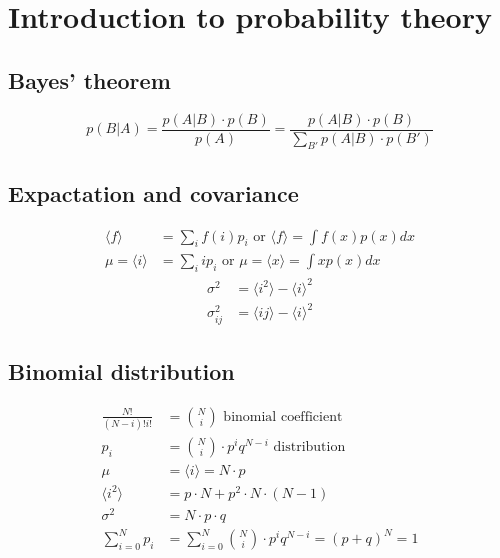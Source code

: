 \section{Introduction to probability theory}

\subsection*{Bayes' theorem}

\begin{equation*}
    p(B|A) = \frac{p(A|B) \cdot p(B)}{p(A)} = \frac{p(A|B) \cdot p(B)}{\sum_{B'}p(A|B) \cdot p(B')}
\end{equation*}

\subsection*{Expactation and covariance}

\begin{equation*}
    \begin{aligned}
        \langle f \rangle &= \sum_i f(i)p_i \text{ or } \langle f \rangle = \int f(x) p(x) dx \\
        \mu = \langle i \rangle &= \sum_i i p_i \text{ or } \mu = \langle x \rangle = \int x p(x) dx
    \end{aligned}
\end{equation*}
\begin{equation*}
    \begin{aligned}
        \sigma^2 &= \langle i^2 \rangle - \langle i \rangle^2 \\
        \sigma_{ij}^2 &= \langle ij \rangle - \langle i \rangle^2
    \end{aligned}
\end{equation*}

\subsection*{Binomial distribution}

\begin{equation*}
    \begin{aligned}
        \frac{N!}{(N-i)!i!} &= {N \choose i} \text{  binomial coefficient} \\
        p_i &= {N \choose i} \cdot p^i q^{N-i} \text{  distribution} \\
        \mu &= \langle i \rangle = N \cdot p \\
        \langle i^2 \rangle &= p \cdot N + p^2 \cdot N \cdot (N-1) \\
        \sigma^2 &= N \cdot p \cdot q \\
        \sum_{i = 0}^N p_{i} &= \sum_{i = 0}^N {N \choose i} \cdot p^i q^{N-i} = \left(p + q\right)^N = 1
    \end{aligned}
\end{equation*}

